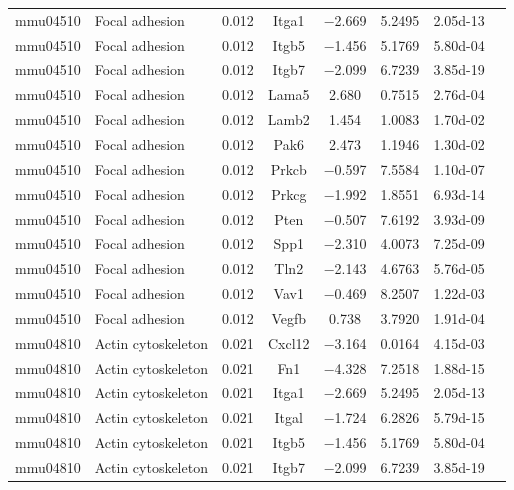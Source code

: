 {\begin{longtable}[l]{cp{4.3cm}cccccc}
mmu04510	& Focal adhesion	& \num{0.012}	& Itga1	& \num{-2.669}	& \num{ 5.2495}	& \num{2.05d-13}\\ 
mmu04510	& Focal adhesion	& \num{0.012}	& Itgb5	& \num{-1.456}	& \num{ 5.1769}	& \num{5.80d-04}\\ 
mmu04510	& Focal adhesion	& \num{0.012}	& Itgb7	& \num{-2.099}	& \num{ 6.7239}	& \num{3.85d-19}\\ 
mmu04510	& Focal adhesion	& \num{0.012}	& Lama5	& \num{ 2.680}	& \num{ 0.7515}	& \num{2.76d-04}\\ 
mmu04510	& Focal adhesion	& \num{0.012}	& Lamb2	& \num{ 1.454}	& \num{ 1.0083}	& \num{1.70d-02}\\ 
mmu04510	& Focal adhesion	& \num{0.012}	& Pak6	& \num{ 2.473}	& \num{ 1.1946}	& \num{1.30d-02}\\ 
mmu04510	& Focal adhesion	& \num{0.012}	& Prkcb	& \num{-0.597}	& \num{ 7.5584}	& \num{1.10d-07}\\ 
mmu04510	& Focal adhesion	& \num{0.012}	& Prkcg	& \num{-1.992}	& \num{ 1.8551}	& \num{6.93d-14}\\ 
mmu04510	& Focal adhesion	& \num{0.012}	& Pten	& \num{-0.507}	& \num{ 7.6192}	& \num{3.93d-09}\\ 
mmu04510	& Focal adhesion	& \num{0.012}	& Spp1	& \num{-2.310}	& \num{ 4.0073}	& \num{7.25d-09}\\ 
mmu04510	& Focal adhesion	& \num{0.012}	& Tln2	& \num{-2.143}	& \num{ 4.6763}	& \num{5.76d-05}\\ 
mmu04510	& Focal adhesion	& \num{0.012}	& Vav1	& \num{-0.469}	& \num{ 8.2507}	& \num{1.22d-03}\\ 
mmu04510	& Focal adhesion	& \num{0.012}	& Vegfb	& \num{ 0.738}	& \num{ 3.7920}	& \num{1.91d-04}\\ 
mmu04810	& Actin cytoskeleton	& \num{0.021}	& Cxcl12	& \num{-3.164}	& \num{ 0.0164}	& \num{4.15d-03}\\ 
mmu04810	& Actin cytoskeleton	& \num{0.021}	& Fn1	& \num{-4.328}	& \num{ 7.2518}	& \num{1.88d-15}\\ 
mmu04810	& Actin cytoskeleton	& \num{0.021}	& Itga1	& \num{-2.669}	& \num{ 5.2495}	& \num{2.05d-13}\\ 
mmu04810	& Actin cytoskeleton	& \num{0.021}	& Itgal	& \num{-1.724}	& \num{ 6.2826}	& \num{5.79d-15}\\ 
mmu04810	& Actin cytoskeleton	& \num{0.021}	& Itgb5	& \num{-1.456}	& \num{ 5.1769}	& \num{5.80d-04}\\ 
mmu04810	& Actin cytoskeleton	& \num{0.021}	& Itgb7	& \num{-2.099}	& \num{ 6.7239}	& \num{3.85d-19}\\ 

\end{longtable}}
